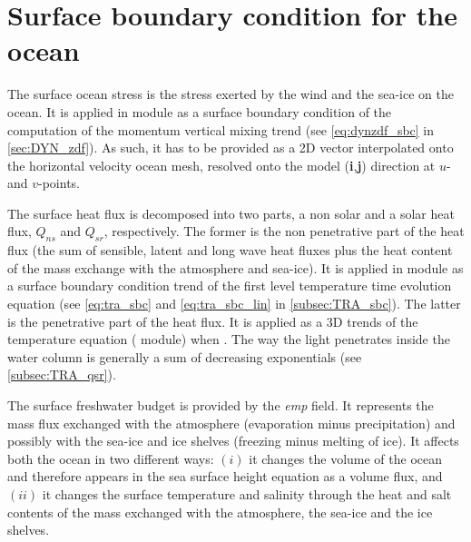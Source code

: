 \documentclass[../main/NEMO_manual]{subfiles}
\begin{document}
\section{Surface boundary condition for the ocean}
\label{sec:SBC_general}

The surface ocean stress is the stress exerted by the wind and the sea-ice on the ocean.
It is applied in  module as a surface boundary condition of the computation of
the momentum vertical mixing trend (see \autoref{eq:dynzdf_sbc} in \autoref{sec:DYN_zdf}).
As such, it has to be provided as a 2D vector interpolated onto the horizontal velocity ocean mesh,
\ie resolved onto the model (\textbf{i},\textbf{j}) direction at $u$- and $v$-points.

The surface heat flux is decomposed into two parts, a non solar and a solar heat flux,
$Q_{ns}$ and $Q_{sr}$, respectively.
The former is the non penetrative part of the heat flux
(\ie the sum of sensible, latent and long wave heat fluxes plus
the heat content of the mass exchange with the atmosphere and sea-ice).
It is applied in  module as a surface boundary condition trend of
the first level temperature time evolution equation
(see \autoref{eq:tra_sbc} and \autoref{eq:tra_sbc_lin} in \autoref{subsec:TRA_sbc}). 
The latter is the penetrative part of the heat flux.
It is applied as a 3D trends of the temperature equation ( module) when
.
The way the light penetrates inside the water column is generally a sum of decreasing exponentials
(see \autoref{subsec:TRA_qsr}). 

The surface freshwater budget is provided by the \textit{emp} field.
It represents the mass flux exchanged with the atmosphere (evaporation minus precipitation) and
possibly with the sea-ice and ice shelves (freezing minus melting of ice).
It affects both the ocean in two different ways:
$(i)$  it changes the volume of the ocean and therefore appears in the sea surface height equation as
a volume flux, and 
$(ii)$ it changes the surface temperature and salinity through the heat and salt contents of
the mass exchanged with the atmosphere, the sea-ice and the ice shelves. 


%
%
%
%
%
%
% 
%
\end{document}
